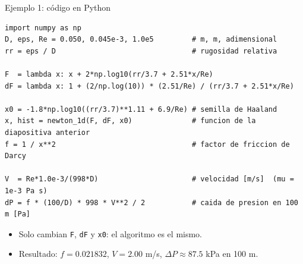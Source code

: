 \documentclass[aspectratio=169,11pt]{beamer}
\begin{document}
\begin{frame}[fragile]{Ejemplo 1: código en Python}
\begin{lstlisting}
import numpy as np
D, eps, Re = 0.050, 0.045e-3, 1.0e5         # m, m, adimensional
rr = eps / D                                # rugosidad relativa

F  = lambda x: x + 2*np.log10(rr/3.7 + 2.51*x/Re)
dF = lambda x: 1 + (2/np.log(10)) * (2.51/Re) / (rr/3.7 + 2.51*x/Re)

x0 = -1.8*np.log10((rr/3.7)**1.11 + 6.9/Re) # semilla de Haaland
x, hist = newton_1d(F, dF, x0)              # funcion de la diapositiva anterior
f = 1 / x**2                                # factor de friccion de Darcy

V  = Re*1.0e-3/(998*D)                      # velocidad [m/s]  (mu = 1e-3 Pa s)
dP = f * (100/D) * 998 * V**2 / 2           # caida de presion en 100 m [Pa]
\end{lstlisting}
  \begin{itemize}
    \item Solo cambian \texttt{F}, \texttt{dF} y \texttt{x0}: el algoritmo es el mismo.
    \item Resultado: $f=0.021832$, \; $V=2.00$ m/s, \; $\Delta P\approx 87.5$ kPa en 100 m.
  \end{itemize}
\end{frame}
\end{document}
